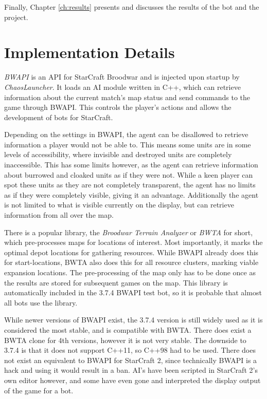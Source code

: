 Finally, Chapter \ref{ch:results} presents and discusses the results of the bot and the project.

\section{Implementation Details}
\emph{BWAPI} is an API for StarCraft Broodwar and is injected upon startup by \emph{ChaosLauncher}. It loads an AI module written in C++, which can retrieve information about the current match's map status and send commands to the game through BWAPI. This controls the player's actions and allows the development of bots for StarCraft.

Depending on the settings in BWAPI, the agent can be disallowed to retrieve information a player would not be able to. This means some units are in some levels of accessibility, where invisible and destroyed units are completely inaccessible. This has some limits however, as the agent can retrieve information about burrowed and cloaked units as if they were not. While a keen player can spot these units as they are not completely transparent, the agent has no limits as if they were completely visible, giving it an advantage. Additionally the agent is not limited to what is visible currently on the display, but can retrieve information from all over the map.

There is a popular library, the \emph{Broodwar Terrain Analyzer} or \emph{BWTA} for short, which pre-processes maps for locations of interest. Most importantly, it marks the optimal depot locations for gathering resources. While BWAPI already does this for start-locations, BWTA also does this for all resource clusters, marking viable expansion locations. The pre-processing of the map only has to be done once as the results are stored for subsequent games on the map. This library is automatically included in the 3.7.4 BWAPI test bot, so it is probable that almost all bots use the library.

While newer versions of BWAPI exist, the 3.7.4 version is still widely used as it is considered the most stable, and is compatible with BWTA. There does exist a BWTA clone for 4th versions, however it is not very stable. The downside to 3.7.4 is that it does not support C++11, so C++98 had to be used. There does not exist an equivalent to BWAPI for StarCraft 2, since technically BWAPI is a hack and using it would result in a ban. AI's have been scripted in StarCraft 2's own editor however, and some have even gone and interpreted the display output of the game for a bot.

